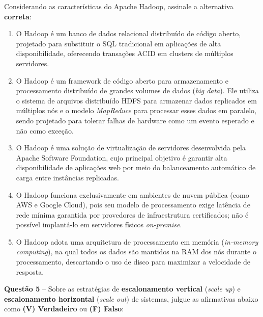 \documentclass[12pt,a4paper]{article}
\begin{document}
\vspace{0.2cm}

Considerando as características do Apache Hadoop, assinale a alternativa \textbf{correta}:

\vspace{0.3cm}

\begin{enumerate}[label=\textbf{(\Alph*)}]
    \item O Hadoop é um banco de dados relacional distribuído de código aberto, projetado para substituir o SQL tradicional em aplicações de alta disponibilidade, oferecendo transações ACID em clusters de múltiplos servidores.

    \item O Hadoop é um framework de código aberto para armazenamento e processamento distribuído de grandes volumes de dados (\textit{big data}). Ele utiliza o sistema de arquivos distribuído HDFS para armazenar dados replicados em múltiplos nós e o modelo \textit{MapReduce} para processar esses dados em paralelo, sendo projetado para tolerar falhas de hardware como um evento esperado e não como exceção.

    \item O Hadoop é uma solução de virtualização de servidores desenvolvida pela Apache Software Foundation, cujo principal objetivo é garantir alta disponibilidade de aplicações web por meio do balanceamento automático de carga entre instâncias replicadas.

    \item O Hadoop funciona exclusivamente em ambientes de nuvem pública (como AWS e Google Cloud), pois seu modelo de processamento exige latência de rede mínima garantida por provedores de infraestrutura certificados; não é possível implantá-lo em servidores físicos \textit{on-premise}.

    \item O Hadoop adota uma arquitetura de processamento em memória (\textit{in-memory computing}), na qual todos os dados são mantidos na RAM dos nós durante o processamento, descartando o uso de disco para maximizar a velocidade de resposta.
\end{enumerate}

\vspace{0.5cm}

\textbf{Questão 5} -- Sobre as estratégias de \textbf{escalonamento vertical} (\textit{scale up}) e \textbf{escalonamento horizontal} (\textit{scale out}) de sistemas, julgue as afirmativas abaixo como \textbf{(V) Verdadeiro} ou \textbf{(F) Falso}:
\end{document}
